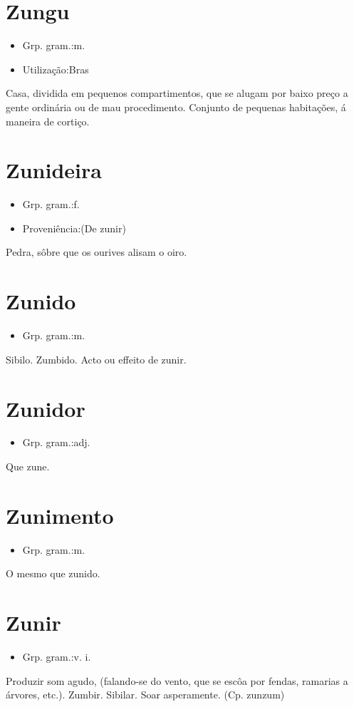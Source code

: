 \section{Zungu}
\begin{itemize}
\item {Grp. gram.:m.}
\end{itemize}
\begin{itemize}
\item {Utilização:Bras}
\end{itemize}
Casa, dividida em pequenos compartimentos, que se alugam por baixo preço a gente ordinária ou de mau procedimento.
Conjunto de pequenas habitações, á maneira de cortiço.
\section{Zunideira}
\begin{itemize}
\item {Grp. gram.:f.}
\end{itemize}
\begin{itemize}
\item {Proveniência:(De \textunderscore zunir\textunderscore )}
\end{itemize}
Pedra, sôbre que os ourives alisam o oiro.
\section{Zunido}
\begin{itemize}
\item {Grp. gram.:m.}
\end{itemize}
Sibilo.
Zumbido.
Acto ou effeito de zunir.
\section{Zunidor}
\begin{itemize}
\item {Grp. gram.:adj.}
\end{itemize}
Que zune.
\section{Zunimento}
\begin{itemize}
\item {Grp. gram.:m.}
\end{itemize}
O mesmo que \textunderscore zunido\textunderscore .
\section{Zunir}
\begin{itemize}
\item {Grp. gram.:v. i.}
\end{itemize}
Produzir som agudo, (falando-se do vento, que se escôa por fendas, ramarias a árvores, etc.).
Zumbir.
Sibilar.
Soar asperamente.
(Cp. \textunderscore zunzum\textunderscore )
